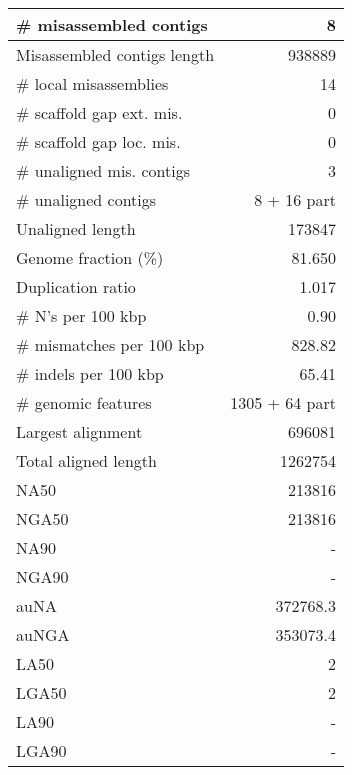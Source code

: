 \documentclass[12pt,a4paper]{article}
\begin{document}
\begin{table}[ht]
\begin{center}
\begin{tabular}{|l*{1}{|r}|}
\# misassembled contigs & 8 \\ \hline
Misassembled contigs length & 938889 \\ \hline
\# local misassemblies & 14 \\ \hline
\# scaffold gap ext. mis. & 0 \\ \hline
\# scaffold gap loc. mis. & 0 \\ \hline
\# unaligned mis. contigs & 3 \\ \hline
\# unaligned contigs & 8 + 16 part \\ \hline
Unaligned length & 173847 \\ \hline
Genome fraction (\%) & 81.650 \\ \hline
Duplication ratio & 1.017 \\ \hline
\# N's per 100 kbp & 0.90 \\ \hline
\# mismatches per 100 kbp & 828.82 \\ \hline
\# indels per 100 kbp & 65.41 \\ \hline
\# genomic features & 1305 + 64 part \\ \hline
Largest alignment & 696081 \\ \hline
Total aligned length & 1262754 \\ \hline
NA50 & 213816 \\ \hline
NGA50 & 213816 \\ \hline
NA90 & - \\ \hline
NGA90 & - \\ \hline
auNA & 372768.3 \\ \hline
auNGA & 353073.4 \\ \hline
LA50 & 2 \\ \hline
LGA50 & 2 \\ \hline
LA90 & - \\ \hline
LGA90 & - \\ \hline
\end{tabular}
\end{center}
\end{table}
\end{document}
